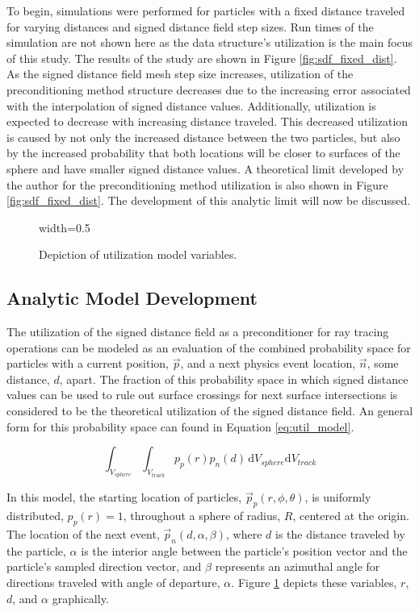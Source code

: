 To begin, simulations were performed for particles with a fixed distance
traveled for varying distances and signed distance field step sizes. Run times
of the simulation are not shown here as the data structure's utilization is the
main focus of this study. The results of the study are shown in
 Figure \ref{fig:sdf_fixed_dist}. As the signed distance field mesh step size
increases, utilization of the preconditioning method structure decreases due to the increasing
error associated with the interpolation of signed distance values. Additionally,
utilization is expected to decrease with increasing distance traveled. This
decreased utilization is caused by not only the increased distance between the
two particles, but also by the increased probability that both locations will be
closer to surfaces of the sphere and have smaller signed distance values. A
theoretical limit developed by the author for the preconditioning method
utilization is also shown in Figure \ref{fig:sdf_fixed_dist}. The development of
this analytic limit will now be discussed.

\begin{figure}[ht]
  \centering
  {width=0.5\textwidth}
  \caption[Depiction of utilization model variables.]{Depiction of utilization
    model variables.}
  \label{fig:model}
\end{figure}

\subsection{Analytic Model Development}

The utilization of the signed distance field as a preconditioner for ray tracing
operations can be modeled as an evaluation of the combined probability space for
particles with a current position, $\vec{p}$, and a next physics event location,
$\vec{n}$, some distance, $d$, apart. The fraction of this probability
space in which signed distance values can be used to rule out surface crossings
for next surface intersections is considered to be the theoretical
utilization of the signed distance field. An general form for this probability
space can found in Equation \eqref{eq:util_model}.

\begin{equation}
  \label{eq:util_model}
\int_{V_{sphere}}\int_{V_{track}} p_p(r) p_n(d) \, \mathrm{d}V_{sphere}\mathrm{d}V_{track}
\end{equation}

In this model, the starting location of particles, $\vec{p}_{p}(r,\phi,\theta)$, is
uniformly distributed, $p_p(r)=1$, throughout a sphere of radius, $R$, centered
at the origin.  The location of the next event, $\vec{p}_{n}(d,\alpha,\beta)$, where $d$
is the distance traveled by the particle, $\alpha$ is the interior angle between
the particle's position vector and the particle's sampled direction
vector, and $\beta$ represents an azimuthal angle for directions traveled with
angle of departure, $\alpha$. Figure \ref{fig:model} depicts these variables, $r$,
$d$, and $\alpha$ graphically.


